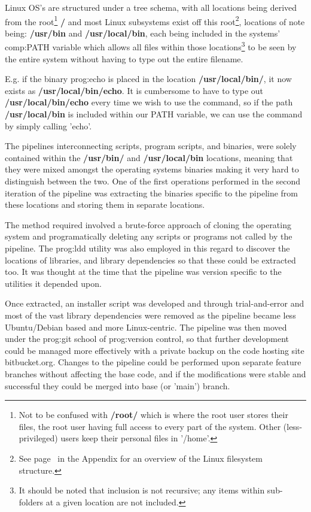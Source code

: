Linux OS's are structured under a tree schema, with all locations being derived from the root\footnote{Not to be confused with \textbf{/root/} which is where the root user stores their files, the root user having full access to every part of the system. Other (less-privileged) users keep their personal files in '/home'.} \textbf{/} and most Linux subsystems exist off this root\footnote{See page~\pageref{ref:app:semaphores} in the Appendix for an overview of the Linux filesystem structure.}, locations of note being: \textbf{/usr/bin} and \textbf{/usr/local/bin}, each being included in the systems' \gls{comp:PATH} variable which allows all files within those locations\footnote{It should be noted that inclusion is not recursive; any items within sub-folders at a given location are not included.} to be seen by the entire system without having to type out the entire filename.

E.g. if the binary \gls{prog:echo} is placed in the location \textbf{/usr/local/bin/}, it now exists as \textbf{/usr/local/bin/echo}. It is cumbersome to have to type out \textbf{/usr/local/bin/echo} every time we wish to use the command, so if the path \textbf{/usr/local/bin} is included within our PATH variable, we can use the command by simply calling 'echo'.\enlargethispage{-\baselineskip}

The pipelines interconnecting scripts, program scripts, and binaries, were solely contained within the \textbf{/usr/bin/} and \textbf{/usr/local/bin} locations, meaning that they were mixed amongst the operating systems binaries making it very hard to distinguish between the two. One of the first operations performed in the second iteration of the pipeline was extracting the binaries specific to the pipeline from these locations and storing them in separate locations.

The method required involved a brute-force approach of cloning the operating system and programatically deleting any scripts or programs not called by the pipeline. The \gls{prog:ldd} utility was also employed in this regard to discover the locations of libraries, and library dependencies so that these could be extracted too. It was thought at the time that the pipeline was version specific to the utilities it depended upon.

Once extracted, an installer script was developed and through trial-and-error and most of the vast library dependencies were removed as the pipeline became less Ubuntu/Debian based and more Linux-centric. The pipeline was then moved under the \gls{prog:git} school of \gls{prog:version control}, so that further development could be managed more effectively with a private backup on the code hosting site bitbucket.org. Changes to the pipeline could be performed upon separate feature branches without affecting the base code, and if the modifications were stable and successful they could be merged into base (or 'main') branch.


